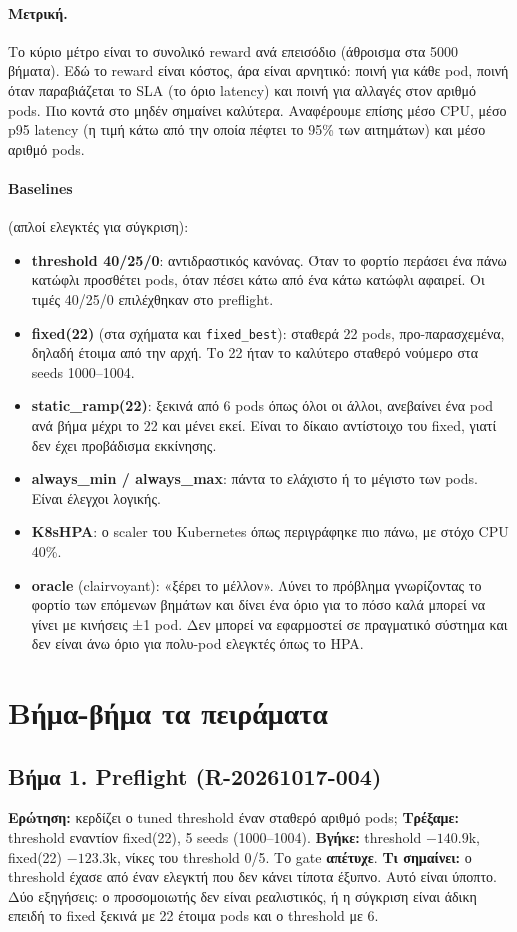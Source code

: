 \documentclass[11pt,a4paper]{article}
\newcommand{\kode}[1]{\texttt{#1}}
\begin{document}
\paragraph{Μετρική.} Το κύριο μέτρο είναι το συνολικό reward ανά επεισόδιο (άθροισμα στα 5000 βήματα). Εδώ το reward είναι κόστος, άρα είναι αρνητικό: ποινή για κάθε pod, ποινή όταν παραβιάζεται το SLA (το όριο latency) και ποινή για αλλαγές στον αριθμό pods. Πιο κοντά στο μηδέν σημαίνει καλύτερα. Αναφέρουμε επίσης μέσο CPU, μέσο p95 latency (η τιμή κάτω από την οποία πέφτει το 95\% των αιτημάτων) και μέσο αριθμό pods.

\paragraph{Baselines} (απλοί ελεγκτές για σύγκριση):
\begin{itemize}
\item \textbf{threshold 40/25/0}: αντιδραστικός κανόνας. Όταν το φορτίο περάσει ένα πάνω κατώφλι προσθέτει pods, όταν πέσει κάτω από ένα κάτω κατώφλι αφαιρεί. Οι τιμές 40/25/0 επιλέχθηκαν στο preflight.
\item \textbf{fixed(22)} (στα σχήματα και \kode{fixed\_best}): σταθερά 22 pods, προ-παρασχεμένα, δηλαδή έτοιμα από την αρχή. Το 22 ήταν το καλύτερο σταθερό νούμερο στα seeds 1000--1004.
\item \textbf{static\_ramp(22)}: ξεκινά από 6 pods όπως όλοι οι άλλοι, ανεβαίνει ένα pod ανά βήμα μέχρι το 22 και μένει εκεί. Είναι το δίκαιο αντίστοιχο του fixed, γιατί δεν έχει προβάδισμα εκκίνησης.
\item \textbf{always\_min / always\_max}: πάντα το ελάχιστο ή το μέγιστο των pods. Είναι έλεγχοι λογικής.
\item \textbf{K8sHPA}: ο scaler του Kubernetes όπως περιγράφηκε πιο πάνω, με στόχο CPU 40\%.
\item \textbf{oracle} (clairvoyant): «ξέρει το μέλλον». Λύνει το πρόβλημα γνωρίζοντας το φορτίο των επόμενων βημάτων και δίνει ένα όριο για το πόσο καλά μπορεί να γίνει με κινήσεις ±1 pod. Δεν μπορεί να εφαρμοστεί σε πραγματικό σύστημα και δεν είναι άνω όριο για πολυ-pod ελεγκτές όπως το HPA.
\end{itemize}

\section{Βήμα-βήμα τα πειράματα}

\subsection{Βήμα 1. Preflight (R-20261017-004)}
\textbf{Ερώτηση:} κερδίζει ο tuned threshold έναν σταθερό αριθμό pods;
\textbf{Τρέξαμε:} threshold εναντίον fixed(22), 5 seeds (1000--1004).
\textbf{Βγήκε:} threshold $-140.9$k, fixed(22) $-123.3$k, νίκες του threshold 0/5. Το gate \textbf{απέτυχε}.
\textbf{Τι σημαίνει:} ο threshold έχασε από έναν ελεγκτή που δεν κάνει τίποτα έξυπνο. Αυτό είναι ύποπτο. Δύο εξηγήσεις: ο προσομοιωτής δεν είναι ρεαλιστικός, ή η σύγκριση είναι άδικη επειδή το fixed ξεκινά με 22 έτοιμα pods και ο threshold με 6.
\end{document}
